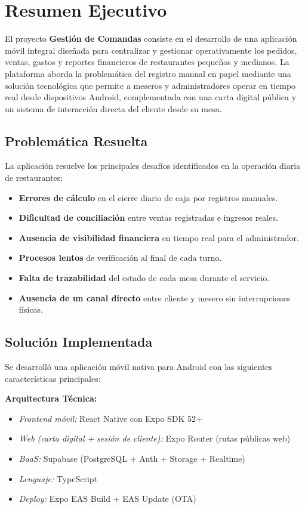 \chapter{Resumen Ejecutivo}

El proyecto \textbf{Gestión de Comandas} consiste en el desarrollo de una aplicación
móvil integral diseñada para centralizar y gestionar operativamente los pedidos,
ventas, gastos y reportes financieros de restaurantes pequeños y medianos. La
plataforma aborda la problemática del registro manual en papel mediante una solución
tecnológica que permite a meseros y administradores operar en tiempo real desde
dispositivos Android, complementada con una carta digital pública y un sistema de
interacción directa del cliente desde su mesa.

\section{Problemática Resuelta}

La aplicación resuelve los principales desafíos identificados en la operación diaria
de restaurantes:

\begin{itemize}[leftmargin=1.5em]
  \item \textbf{Errores de cálculo} en el cierre diario de caja por registros manuales.
  \item \textbf{Dificultad de conciliación} entre ventas registradas e ingresos reales.
  \item \textbf{Ausencia de visibilidad financiera} en tiempo real para el administrador.
  \item \textbf{Procesos lentos} de verificación al final de cada turno.
  \item \textbf{Falta de trazabilidad} del estado de cada mesa durante el servicio.
  \item \textbf{Ausencia de un canal directo} entre cliente y mesero sin interrupciones físicas.
\end{itemize}

\section{Solución Implementada}

Se desarrolló una aplicación móvil nativa para Android con las siguientes
características principales:

\textbf{Arquitectura Técnica:}
\begin{itemize}[leftmargin=1.5em]
  \item \textit{Frontend móvil:} React Native con Expo SDK 52+
  \item \textit{Web (carta digital + sesión de cliente):} Expo Router (rutas públicas web)
  \item \textit{BaaS:} Supabase (PostgreSQL + Auth + Storage + Realtime)
  \item \textit{Lenguaje:} TypeScript
  \item \textit{Deploy:} Expo EAS Build + EAS Update (OTA)
\end{itemize}

